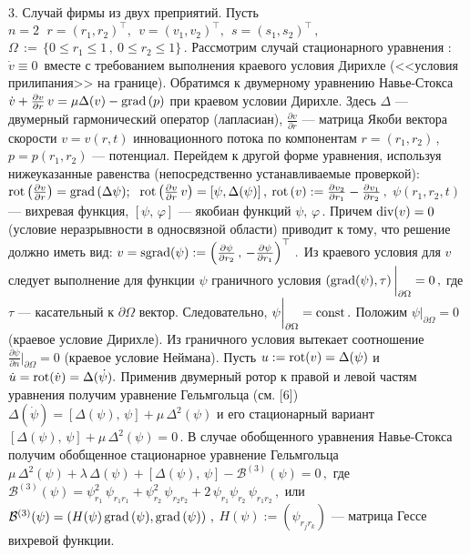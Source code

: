 3. Случай фирмы из двух преприятий. Пусть
 $
n=2\, \ \ r=\left(r_1, r_2\right)^\top, \ \ v=\left(v_1,
v_2\right)^\top, \ \ s=\left(s_1,s_2\right)^\top\,,
 $
 $
\Omega\,:= \,  \{0 \le r_1 \le 1\,, \ 0 \le r_2 \le 1\}\,.
 $
Рассмотрим случай стационарного уравнения :\ $\dot v \equiv 0$\,
вместе с  требованием выполнения краевого условия Дирихле (<<условия
прилипания>> на границе). Обратимся к двумерному уравнению
Навье-Стокса
  $
\dot v + \frac{\partial v}{\partial r}\,v = \mu\Delta (v) - {\rm
grad}\,(p)
  $
при краевом условии Дирихле. Здесь $\Delta$ --- двумерный
гармонический оператор (лапласиан), $\frac{\partial v}{\partial r}$
--- матрица Якоби вектора скорости $v=v(r,t)$ инновационного
потока по компонентам $r=(r_1,r_2)$\,, \ $p=p(r_1,r_2)$ ---
потенциал. Перейдем к другой форме уравнения, используя
нижеуказанные равенства (непосредственно устанавливаемые проверкой):
  $
{\rm rot}\left(\frac{\partial v}{\partial r}\right)={\rm
grad}\,(\Delta \psi);
 $
 $ \ {\rm rot}\left(\frac{\partial
v}{\partial r}\, v\right)=[\psi,\Delta (\psi)]\,,
  $
$ {\rm rot}\,(v) := \frac{\partial v_2}{\partial r_1}-\frac{\partial
v_1}{\partial r_2}\,, $ $\psi (r_1,r_2,t)$ --- вихревая функция,
$[\psi,\,\varphi]$ --- якобиан функций $\psi,\,\varphi$\,. Причем $
{\rm div}(v) =0 $ (условие неразрывности в односвязной области)
приводит к тому, что решение должно иметь вид:
 $
v = {\rm sgrad}(\psi) := \left(\frac{\partial\psi}{\partial
r_2}\,,\,-\frac{\partial\psi}{\partial r_1}\right)^\top\,.
 $
Из краевого условия для $v$ следует выполнение для функции $\psi$
граничного условия
  $
({\rm grad}(\psi),\tau)\,\bigg |_{\partial \Omega} = 0\,,
  $
где $\tau$ --- касательный к $\partial \Omega$ вектор.
Следовательно, $ \psi\bigg |_{\partial \Omega} = {\rm const}\,.$
Положим
 $
\psi\bigg |_{\partial \Omega} = 0\,
 $
(краевое условие Дирихле). Из граничного условия вытекает
соотношение
 $
\frac{\partial \psi}{\partial n}\bigg |_{\partial \Omega} = 0
  $
(краевое условие Неймана). Пусть $ u := {\rm rot}(v) = \Delta(\psi)$
и $ \dot u = {\rm rot}(\dot{v})=\Delta(\dot\psi). $ Применив
двумерный ротор к правой и левой частям уравнения получим уравнение
Гельмгольца (см. [6])
 $
\Delta(\dot\psi) = [\Delta(\psi),\,\psi] + \mu\,\Delta^2(\psi)
 $
и его стационарный вариант
 $
[\Delta(\psi),\,\psi] + \mu\,\Delta^2(\psi) = 0 \,.
 $
В случае обобщенного уравнения Навье-Стокса  получим обобщенное
стационарное уравнение Гельмгольца
 $
\mu\,\Delta^2(\psi) + \lambda\,\Delta(\psi) + [\Delta(\psi),\,\psi]
- \mathcal{B}^{(3)}(\psi) = 0 \,,
 $
где
 $
\mathcal{B}^{(3)}(\psi) = \psi_{r_1}^2\,\psi_{r_1r_1}+
\psi_{r_2}^2\,\psi_{r_2r_2}+
2\,\psi_{r_1}\psi_{r_2}\,\psi_{r_1r_2}\,,
 $ или
 $
\mathcal{B}^{(3)}(\psi)= \left(H(\psi)\,{\rm grad}\,(\psi) , {\rm
grad}\,(\psi)\right)\,,
 $
$H(\psi):= (\psi_{r_jr_k})$ --- матрица Гессе вихревой функции.


